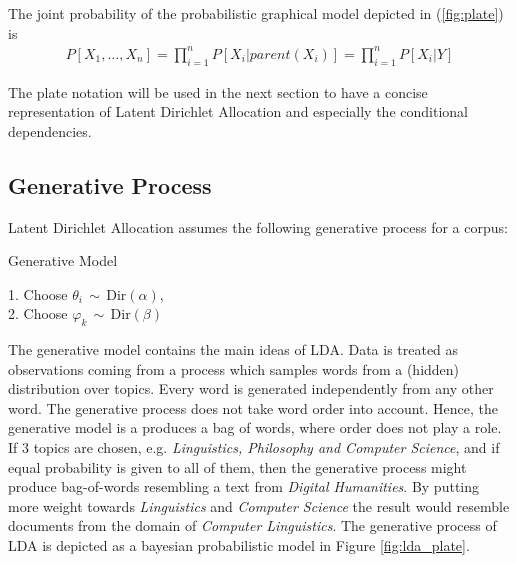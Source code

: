 \documentclass[a4paper,ngerman]{atseminar}
\begin{document}
The joint probability of the probabilistic graphical model depicted in (\ref{fig:plate}) is
\begin{align}
P[X_1,\ldots,X_n]=\prod_{i=1}^nP[X_i | parent(X_i)] = \prod_{i=1}^nP[X_i | Y]
\end{align}

The plate notation will be used in the next section to have a concise representation of
Latent Dirichlet Allocation and especially the conditional dependencies.

%


\subsection{Generative Process}
Latent Dirichlet Allocation assumes the following generative process for
a corpus: \\

\begin{algorithm}[H]
\caption{Generative Model}
1. Choose $ \theta_i \, \sim \, \mathrm{Dir}(\alpha) $,  \\
2. Choose $ \varphi_k \, \sim \, \mathrm{Dir}(\beta) $ \\
\end{algorithm}
\vspace{1.5cm}

The generative model contains the main ideas of LDA. Data is treated as observations
coming from a process which samples words from a (hidden) distribution over topics.
Every word is generated independently from any other word. The generative process
does not take word order into account. Hence, the generative model is a produces a
bag of words, where order does not play a role. \\
If $3$ topics are chosen, e.g. \textit{Linguistics, Philosophy and Computer Science}, and if 
equal probability is given to all of them, then the generative process might produce 
bag-of-words resembling a text from \textit{Digital Humanities}. By putting more weight 
towards \textit{Linguistics} and \textit{Computer Science} the result would resemble 
documents from the domain of \textit{Computer Linguistics}.
The generative process of LDA is depicted as a bayesian probabilistic model in Figure \ref{fig:lda_plate}.
\end{document}
